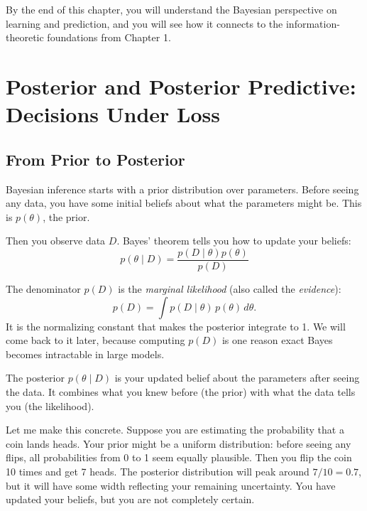 By the end of this chapter, you will understand the Bayesian perspective on learning and prediction, and you will see how it connects to the information-theoretic foundations from Chapter 1.

\vspace{2em}

\section{Posterior and Posterior Predictive: Decisions Under Loss}

\subsection{From Prior to Posterior}

Bayesian inference starts with a prior distribution over parameters. Before seeing any data, you have some initial beliefs about what the parameters might be. This is $p(\theta)$, the prior.

Then you observe data $D$. Bayes' theorem tells you how to update your beliefs:
\begin{equation}
p(\theta \mid D) = \frac{p(D \mid \theta) p(\theta)}{p(D)}
\end{equation}

\noindent The denominator $p(D)$ is the \emph{marginal likelihood} (also called the \emph{evidence}):
\begin{equation}
p(D)=\int p(D\mid \theta)\,p(\theta)\,d\theta.
\end{equation}
It is the normalizing constant that makes the posterior integrate to 1. We will come back to it later, because computing $p(D)$ is one reason exact Bayes becomes intractable in large models.

The posterior $p(\theta \mid D)$ is your updated belief about the parameters after seeing the data. It combines what you knew before (the prior) with what the data tells you (the likelihood).

Let me make this concrete. Suppose you are estimating the probability that a coin lands heads. Your prior might be a uniform distribution: before seeing any flips, all probabilities from 0 to 1 seem equally plausible. Then you flip the coin 10 times and get 7 heads. The posterior distribution will peak around $7/10 = 0.7$, but it will have some width reflecting your remaining uncertainty. You have updated your beliefs, but you are not completely certain.

